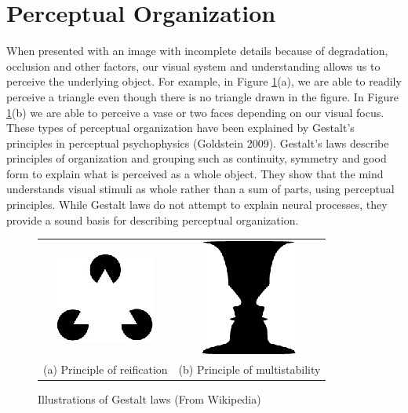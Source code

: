 \section*{Perceptual Organization}

When presented with an image with incomplete details because of degradation, occlusion and other factors, our visual system and understanding allows us to perceive the underlying object. For example, in Figure \ref{chap1-fig1}(a), we are able to readily perceive a triangle even though there is no triangle drawn in the figure. In Figure \ref{chap1-fig1}(b) we are able to perceive a vase or two faces depending on our visual focus. These types of perceptual organization have been explained by Gestalt’s principles in perceptual psychophysics (Goldstein 2009). Gestalt’s laws describe principles of organization and grouping such as continuity, symmetry and good form to explain what is perceived as a whole object. They show that the mind understands visual stimuli as whole rather than a sum of parts, using perceptual principles. While Gestalt laws do not attempt to explain neural processes, they provide a sound basis for describing perceptual organization. 

\begin{figure}[H]
\centering

\begin{tabular}[t]{cc}
\includegraphics[scale=1.3]{figures/1.eps} & \includegraphics{figures/2.eps}\\[5pt]
(a) Principle of reification & (b) Principle of multistability
\end{tabular}

\caption{Illustrations of Gestalt laws (From Wikipedia)}\label{chap1-fig1}
\end{figure}

